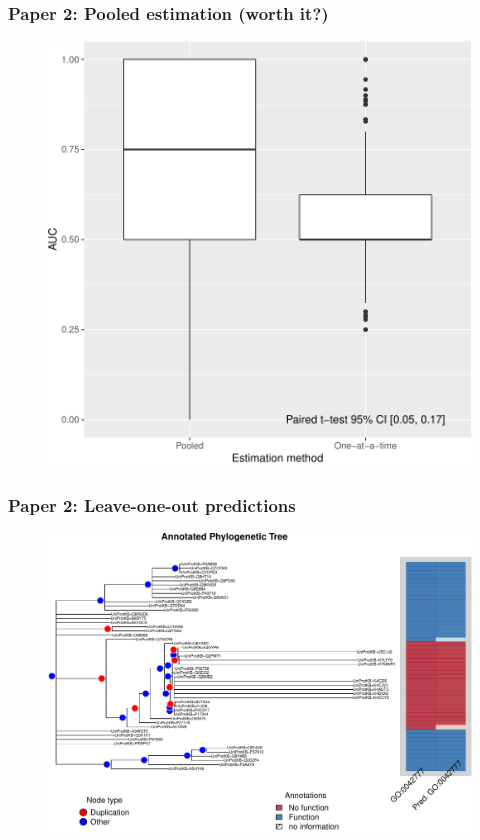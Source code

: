 \documentclass[aspectratio=169, 10pt]{beamer}\usepackage[]{graphicx}\usepackage[]{color}
\begin{document}
\begin{frame}
\frametitle{Paper 2: Pooled estimation (worth it?)}

\begin{figure}
\centering
\includegraphics[width=.5\linewidth]{comparing-accuracy-1.pdf}
\end{figure}

\end{frame}

\begin{frame}
\frametitle{Paper 2: Leave-one-out predictions}

\begin{figure}
\centering
\includegraphics[width=.7\linewidth]{annotations1.pdf}
\end{figure}

\end{frame}
\end{document}

